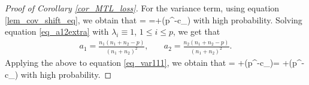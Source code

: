 \begin{proof}[Proof of Corollary \ref{cor_MTL_loss}]
For the variance term, using equation \eqref{lem_cov_shift_eq}, we obtain that
\be\label{eq_var111} = \tr{}=+\OO(p^{-c_\varphi})\ee
with high probability. Solving equation \eqref{eq_a12extra} with $\lambda_i\equiv 1$, $1\le i\le p$, we get that  
	\begin{align}
		 a_1 = \frac{n_1(n_1 + n_2 - p)}{(n_1 + n_2)^2} ,\quad
		& a_2 = \frac{n_2(n_1 + n_2 - p)}{(n_1 +n_2)^2} . \label{simplesovlea12}
			\end{align}
Applying the above to equation \eqref{eq_var111}, we obtain that
\be\label{eq_var112}  =  \cdot {}+\OO(p^{-c_\varphi})=  +\OO(p^{-c_\varphi})\ee
with high probability. 


\end{proof}
